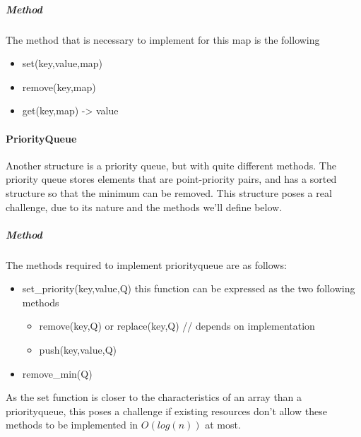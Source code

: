 \subparagraph{Method}
The method that is necessary to implement for this map is the following

\begin{itemize}
    \item set(key,value,map)
    \item remove(key,map)
    \item get(key,map) -> value
\end{itemize}


\paragraph{PriorityQueue}
Another structure is a priority queue, but with quite different methods.
The priority queue stores elements that are point-priority pairs, and has a sorted structure so that the minimum can be removed. This structure poses a real challenge, due to its nature and the methods we'll define below.


\subparagraph{Method}
The methods required to implement priorityqueue are as follows:
\begin{itemize}
    \item set\_priority(key,value,Q) this function can be expressed as the two following methods
    \begin{itemize}
        \item remove(key,Q) or replace(key,Q) // depends on implementation
        \item push(key,value,Q)
    \end{itemize}
    \item remove\_min(Q)
\end{itemize}

As the set function is closer to the characteristics of an array than a priorityqueue, this poses a challenge if existing resources don't allow these methods to be implemented in $O(log(n))$ at most.



